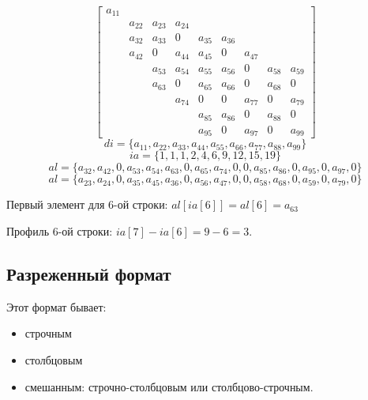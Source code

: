 \begin{example}
    \[\begin{bmatrix}
            a_{11} &                                                                       \\
                   & a_{22} & a_{23} & a_{24}                                              \\
                   & a_{32} & a_{33} & 0      & a_{35} & a_{36}                            \\
                   & a_{42} & 0      & a_{44} & a_{45} & 0      & a_{47}                   \\
                   &        & a_{53} & a_{54} & a_{55} & a_{56} & 0      & a_{58} & a_{59} \\
                   &        & a_{63} & 0      & a_{65} & a_{66} & 0      & a_{68} & 0      \\
                   &        &        & a_{74} & 0      & 0      & a_{77} & 0      & a_{79} \\
                   &        &        &        & a_{85} & a_{86} & 0      & a_{88} & 0      \\
                   &        &        &        & a_{95} & 0      & a_{97} & 0      & a_{99}
        \end{bmatrix} \]
    \[di = \{a_{11}, a_{22}, a_{33}, a_{44}, a_{55}, a_{66}, a_{77}, a_{88}, a_{99}\}\]
    \[ia = \{1, 1, 1, 2, 4, 6, 9, 12, 15, 19\}\]
    \[al = \{a_{32}, a_{42}, 0, a_{53}, a_{54}, a_{63}, 0, a_{65}, a_{74}, 0, 0, a_{85}, a_{86}, 0, a_{95},  0, a_{97}, 0\}\]
    \[al = \{a_{23}, a_{24}, 0, a_{35}, a_{45}, a_{36}, 0, a_{56}, a_{47}, 0, 0, a_{58}, a_{68}, 0, a_{59}, 0, a_{79}, 0\} \]

    Первый элемент для 6-ой строки: \(al[ia[6]] = al[6] = a_{63}\)

    Профиль 6-ой строки: \(ia[7] - ia[6] = 9 - 6 = 3\).
\end{example}

\subsection{Разреженный формат}

Этот формат бывает:
\begin{itemize}
    \item строчным
    \item столбцовым
    \item смешанным: строчно-столбцовым или столбцово-строчным.
\end{itemize}